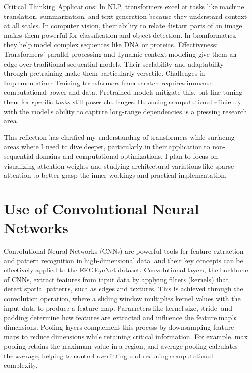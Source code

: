 \documentclass{article}
\begin{document}
Critical Thinking
Applications:
In NLP, transformers excel at tasks like machine translation, summarization, and text generation because they understand context at all scales.
In computer vision, their ability to relate distant parts of an image makes them powerful for classification and object detection.
In bioinformatics, they help model complex sequences like DNA or proteins.
Effectiveness:
Transformers’ parallel processing and dynamic context modeling give them an edge over traditional sequential models. Their scalability and adaptability through pretraining make them particularly versatile.
Challenges in Implementation:
Training transformers from scratch requires immense computational power and data. Pretrained models mitigate this, but fine-tuning them for specific tasks still poses challenges.
Balancing computational efficiency with the model’s ability to capture long-range dependencies is a pressing research area.

This reflection has clarified my understanding of transformers while surfacing areas where I need to dive deeper, particularly in their application to non-sequential domains and computational optimizations. I plan to focus on visualizing attention weights and studying architectural variations like sparse attention to better grasp the inner workings and practical implementation.

\section {Use of Convolutional Neural Networks}

Convolutional Neural Networks (CNNs) are powerful tools for feature extraction and pattern recognition in high-dimensional data, and their key concepts can be effectively applied to the EEGEyeNet dataset. Convolutional layers, the backbone of CNNs, extract features from input data by applying filters (kernels) that detect spatial patterns, such as edges and textures. This is achieved through the convolution operation, where a sliding window multiplies kernel values with the input data to produce a feature map. Parameters like kernel size, stride, and padding determine how features are extracted and influence the feature map's dimensions. Pooling layers complement this process by downsampling feature maps to reduce dimensions while retaining critical information. For example, max pooling retains the maximum value in a region, and average pooling calculates the average, helping to control overfitting and reducing computational complexity.
\end{document}
